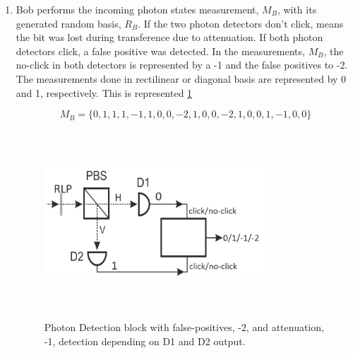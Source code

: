 \begin{enumerate}
	\item Bob performs the incoming photon states measurement, $M_{B}$, with its generated random basis, $R_{B}$. If the two photon detectors don't click, means the bit was lost during transference due to attenuation. If both photon detectors click, a false positive was detected. In the measurements, $M_{B}$, the no-click in both detectors is represented by a -1 and the false positives to -2. The measurements done in rectilinear or diagonal basis are represented by 0 and 1, respectively. This is represented \ref{fig:bb84 detector}
	
	$$M_{B} = \{0,1,1,1,-1,1,0,0,-2,1,0,0,-2,1,0,0,1,-1,0,0\}$$	
	
	\begin{figure}[H]
		\centering
		\includegraphics[width=0.8\textwidth,height=7cm]{./sdf/bb84_with_discrete_variables/figures/detector.png}
		\caption{Photon Detection block with false-positives, -2, and attenuation, -1, detection depending on D1 and D2 output.\label{fig:bb84 detector}}
	\end{figure}
	
\end{enumerate}

